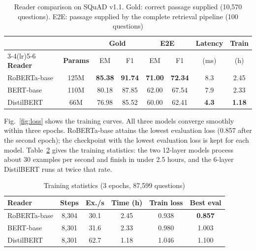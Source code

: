 \documentclass[conference]{IEEEtran}
\newcommand{\best}[1]{\textbf{#1}}
\begin{document}
\begin{table}[t]
\centering
\caption{Reader comparison on SQuAD v1.1. Gold: correct passage supplied (10,570 questions).
E2E: passage supplied by the complete retrieval pipeline (100 questions)}
\label{tab:readers}
\footnotesize
\setlength{\tabcolsep}{3.2pt}
\begin{tabular}{@{}lccccccc@{}}
\toprule
 & & \multicolumn{2}{c}{\textbf{Gold}} & \multicolumn{2}{c}{\textbf{E2E}} & \textbf{Latency} & \textbf{Train} \\
\cmidrule(lr){3-4}\cmidrule(lr){5-6}
\textbf{Reader} & \textbf{Params} & EM & F1 & EM & F1 & (ms) & (h) \\
\midrule
RoBERTa-base   & 125M & \best{85.38} & \best{91.74} & \best{71.00} & \best{72.34} & 8.3 & 2.45 \\
BERT-base      & 110M & 80.18 & 87.85 & 62.00 & 67.54 & 7.9 & 2.33 \\
DistilBERT     & 66M  & 76.98 & 85.52 & 60.00 & 62.41 & \best{4.3} & \best{1.18} \\
\bottomrule
\end{tabular}
\end{table}

Fig.~\ref{fig:loss} shows the training curves. All three models converge smoothly within three
epochs. RoBERTa-base attains the lowest evaluation loss (0.857 after the second epoch); the
checkpoint with the lowest evaluation loss is kept for each model. Table~\ref{tab:train} gives
the training statistics: the two 12-layer models process about 30 examples per second and
finish in under 2.5 hours, and the 6-layer DistilBERT runs at twice that rate.

\begin{table}[t]
\centering
\caption{Training statistics (3 epochs, 87,599 questions)}
\label{tab:train}
\footnotesize
\setlength{\tabcolsep}{4pt}
\begin{tabular}{@{}lccccc@{}}
\toprule
\textbf{Reader} & \textbf{Steps} & \textbf{Ex./s} & \textbf{Time (h)} & \textbf{Train loss} & \textbf{Best eval} \\
\midrule
RoBERTa-base & 8,304 & 30.1 & 2.45 & 0.938 & \best{0.857} \\
BERT-base    & 8,301 & 31.6 & 2.33 & 0.980 & 1.003 \\
DistilBERT   & 8,301 & 62.7 & 1.18 & 1.046 & 1.100 \\
\bottomrule
\end{tabular}
\end{table}
\end{document}
